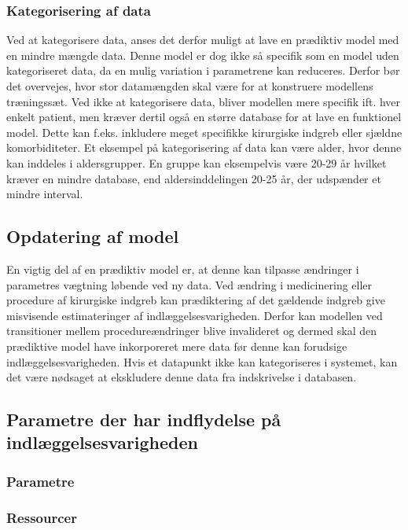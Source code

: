 \subsubsection{Kategorisering af data}
Ved at kategorisere data, anses det derfor muligt at lave en prædiktiv model med en mindre mængde data. Denne model er dog ikke så specifik som en model uden kategoriseret data, da en mulig variation i parametrene kan reduceres.\cite{Rowan2007} 
Derfor bør det overvejes, hvor stor datamængden skal være for at konstruere modellens træningssæt. Ved ikke at kategorisere data, bliver modellen mere specifik ift. hver enkelt patient, men kræver dertil også en større database for at lave en funktionel model. Dette kan f.eks. inkludere meget specifikke kirurgiske indgreb eller sjældne komorbiditeter. 
Et eksempel på kategorisering af data kan være alder, hvor denne kan inddeles i aldersgrupper. En gruppe kan eksempelvis være 20-29 år hvilket kræver en mindre database, end aldersinddelingen 20-25 år, der udspænder et mindre interval.\cite{Rowan2007}  

\subsection{Opdatering af model}
En vigtig del af en prædiktiv model er, at denne kan tilpasse ændringer i parametres vægtning løbende ved ny data.\cite{Kuhn2013} Ved ændring i medicinering eller procedure af kirurgiske indgreb kan prædiktering af det gældende indgreb give misvisende estimateringer af indlæggelsesvarigheden. Derfor kan modellen ved transitioner mellem procedureændringer blive invalideret og dermed skal den prædiktive model have inkorporeret mere data før denne kan forudsige indlæggelsesvarigheden. 
Hvis et datapunkt ikke kan kategoriseres i systemet, kan det være nødsaget at ekskludere denne data fra indskrivelse i databasen.

\subsection{Parametre der har indflydelse på indlæggelsesvarigheden}

\subsubsection{Parametre}

\subsubsection{Ressourcer}